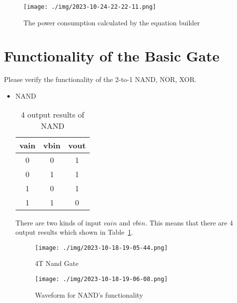 \documentclass{article}
\begin{document}
    \begin{figure}[H]
        \centering
        \texttt{[image: ./img/2023-10-24-22-22-11.png]}
        \caption{The power consumption calculated by the equation builder
        }
        \label{build-P}
    \end{figure}

    
    \clearpage 

    \section{ Functionality of the Basic Gate}
    
    \noindent    Please verify the functionality of the 2-to-1 NAND, NOR, XOR.
        \hspace*{1em}
        \begin{itemize}

            \item NAND
            \begin{table}[H]
                \caption{4 output results of NAND}
                \centering\large
                \begin{tabular}{|c|c|c|}
                    \hline
                    \textbf{vain} & \textbf{vbin} & \textbf{vout}  \\
                    \hline
                    0 & 0 & 1\\
                    \hline
                    0 & 1 & 1\\
                    \hline
                    1 & 0 & 1\\
                    \hline
                    1 & 1 & 0 \\ \hline
                \end{tabular}
                \label{NAND}
            \end{table}

    There are two kinds of input $vain$ and $vbin$. This means that there are 4 output results which shown in Table~\ref{NAND}.


\begin{figure}[H]
    \centering
    \begin{minipage}[t]{0.3\textwidth}
    \centering
        \texttt{[image: ./img/2023-10-18-19-05-44.png]}
    \caption{4T Nand Gate}
    \label{filter}
    \end{minipage}
    \qquad
    \begin{minipage}[t]{0.5\textwidth}
    \centering
        \texttt{[image: ./img/2023-10-18-19-06-08.png]}
    \caption{Waveform for NAND's functionality}
    \label{db10}
    \end{minipage}
    \end{figure}




\end{itemize}
\end{document}
